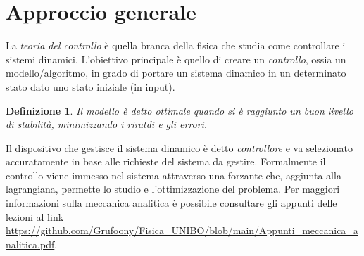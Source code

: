 \documentclass[12pt, a4paper]{book}
\theoremstyle{theorem}
\newtheorem{definition}{Definizione}[section]
\begin{document}
		\section{Approccio generale}
			La \emph{teoria del controllo} è quella branca della fisica che studia come controllare i sistemi dinamici.
			L'obiettivo principale è quello di creare un \emph{controllo}, ossia un modello/algoritmo, in grado di portare un sistema dinamico in un determinato stato dato uno stato iniziale (in input).
			\begin{definition}
				Il modello è detto ottimale quando si è raggiunto un buon livello di stabilità, minimizzando i riratdi e gli errori.
			\end{definition}
			Il dispositivo che gestisce il sistema dinamico è detto \emph{controllore} e va selezionato accuratamente in base alle richieste del sistema da gestire.
			Formalmente il controllo viene immesso nel sistema attraverso una forzante che, aggiunta alla lagrangiana, permette lo studio e l'ottimizzazione del problema.
			Per maggiori informazioni sulla meccanica analitica è possibile consultare gli appunti delle lezioni al link \url{https://github.com/Grufoony/Fisica_UNIBO/blob/main/Appunti_meccanica_analitica.pdf}.
		
\end{document}
